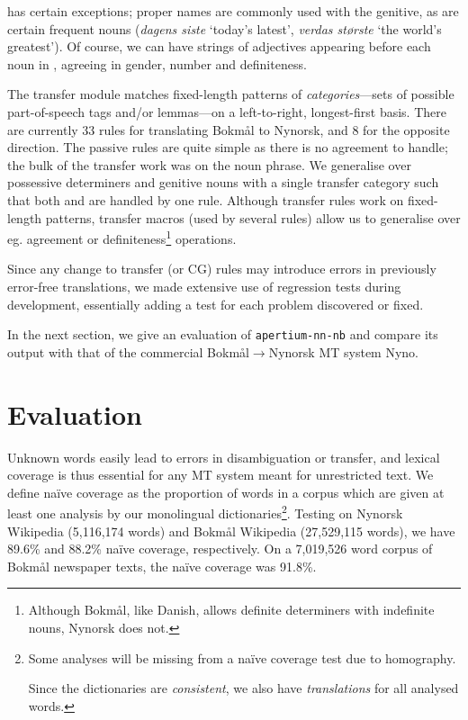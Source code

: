 \documentclass[11pt]{article}
\begin{document}
\Last has certain exceptions; proper names are commonly used with the
genitive, as are certain frequent nouns (\emph{dagens siste} `today's
latest', \emph{verdas største} `the world's greatest'). Of course, we
can have strings of adjectives appearing before each noun in
\Last[a-d], agreeing in gender, number and definiteness. 

The transfer module matches fixed-length patterns of
\emph{categories}—sets of possible part-of-speech tags and/or
lemmas—on a left-to-right, longest-first basis. There are currently 33
rules for translating Bokmål to Nynorsk, and 8 for the opposite
direction. The passive rules are quite simple as there is no agreement
to handle; the bulk of the transfer work was on the noun phrase. We
generalise over possessive determiners and genitive nouns with a
single transfer category such that both \Last[a-b] and \Last[c-d] are
handled by one rule. Although transfer rules work on fixed-length
patterns, transfer macros (used by several rules) allow us to
generalise over eg. agreement or definiteness\footnote{Although
  Bokmål, like Danish, allows definite determiners with indefinite
  nouns, Nynorsk does not.} operations.

Since any change to transfer (or CG) rules may introduce
errors in previously error-free translations, we made extensive use of
regression tests during development, essentially adding a test for
each problem discovered or fixed.

In the next section, we give an evaluation of {\tt apertium-nn-nb} and
compare its output with that of the commercial
Bokmål$\rightarrow$Nynorsk MT system Nyno.


\section{Evaluation}
\label{sec:eval}

Unknown words easily lead to errors in disambiguation or
transfer, and lexical coverage is thus essential for any MT system meant for
unrestricted text.  We define naïve coverage as the proportion of
words in a corpus which are given at least one analysis by our
monolingual dictionaries\footnote{Some analyses will be missing from a
naïve coverage test due to homography. 

Since the dictionaries are \emph{consistent}, we also have
\emph{translations} for all analysed words.}. Testing on Nynorsk
Wikipedia (5,116,174 words) and Bokmål Wikipedia (27,529,115 words),
we have 89.6\% and 88.2\% naïve coverage, respectively. On a 7,019,526
word corpus of Bokmål newspaper texts, the naïve coverage was 91.8\%.
\end{document}
